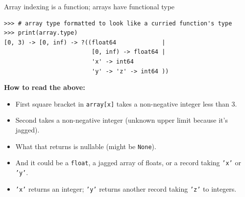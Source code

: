 \documentclass[aspectratio=169]{beamer}
\begin{document}
\begin{frame}[fragile]{Array indexing is a function; arrays have functional type}
\small
\begin{verbatim}
>>> # array type formatted to look like a curried function's type
>>> print(array.type)
[0, 3) -> [0, inf) -> ?((float64             |
                         [0, inf) -> float64 |
                         'x' -> int64
                         'y' -> 'z' -> int64 ))
\end{verbatim}

\normalsize
\vspace{0.5 cm}
{\bf How to read the above:}
\begin{itemize}
\item First square bracket in \texttt{array[x]} takes a non-negative integer less than 3.
\item Second takes a non-negative integer (unknown upper limit because it's jagged).
\item What that returns is nullable (might be \texttt{None}).
\item And it could be a \texttt{float}, a jagged array of floats, or a record taking \texttt{'x'} or \texttt{'y'}.
\item \texttt{'x'} returns an integer; \texttt{'y'} returns another record taking \texttt{'z'} to integers.
\end{itemize}
\end{frame}
\end{document}
